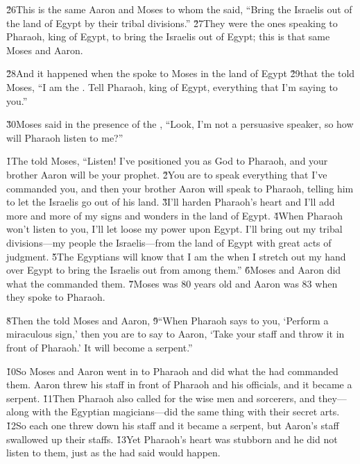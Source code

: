 \v{26}This is the same Aaron and Moses to whom the  said, ``Bring the Israelis out of the land of Egypt by their tribal divisions.'' \v{27}They were the ones speaking to Pharaoh, king of Egypt, to bring the Israelis out of Egypt; this is that same Moses and Aaron.

\v{28}And it happened when the  spoke to Moses in the land of Egypt \v{29}that the  told Moses, ``I am the . Tell Pharaoh, king of Egypt, everything that I'm saying to you.''

\v{30}Moses said in the presence of the , ``Look, I'm not a persuasive speaker, so how will Pharaoh listen to me?''

\v{1}The  told Moses, ``Listen! I've positioned you as God to Pharaoh, and your brother Aaron will be your prophet. \v{2}You are to speak everything that I've commanded you, and then your brother Aaron will speak to Pharaoh, telling him to let the Israelis go out of his land. \v{3}I'll harden Pharaoh's heart and I'll add more and more of my signs and wonders in the land of Egypt. \v{4}When Pharaoh won't listen to you, I'll let loose my power upon Egypt. I'll bring out my tribal divisions---my people the Israelis---from the land of Egypt with great acts of judgment. \v{5}The Egyptians will know that I am the  when I stretch out my hand over Egypt to bring the Israelis out from among them.'' \v{6}Moses and Aaron did what the  commanded them. \v{7}Moses was 80 years old and Aaron was 83 when they spoke to Pharaoh.

\v{8}Then the  told Moses and Aaron, \v{9}``When Pharaoh says to you, `Perform a miraculous sign,' then you are to say to Aaron, `Take your staff and throw it in front of Pharaoh.' It will become a serpent.''

\v{10}So Moses and Aaron went in to Pharaoh and did what the  had commanded them. Aaron threw his staff in front of Pharaoh and his officials, and it became a serpent. \v{11}Then Pharaoh also called for the wise men and sorcerers, and they---along with the Egyptian magicians---did the same thing with their secret arts. \v{12}So each one threw down his staff and it became a serpent, but Aaron's staff swallowed up their staffs. \v{13}Yet Pharaoh's heart was stubborn and he did not listen to them, just as the  had said would happen.

